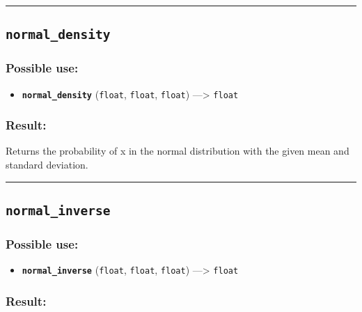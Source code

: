 \documentclass[]{book}
\providecommand{\tightlist}{%
  \setlength{\itemsep}{0pt}\setlength{\parskip}{0pt}}
\theoremstyle{definition}
\theoremstyle{definition}
\theoremstyle{definition}
\theoremstyle{remark}
\begin{document}
\begin{center}\rule{0.5\linewidth}{\linethickness}\end{center}

\subsection{\texorpdfstring{\texttt{normal\_density}}{normal\_density}}\label{normal_density}

\subsubsection{Possible use:}\label{possible-use-378}

\begin{itemize}
\tightlist
\item
  \textbf{\texttt{normal\_density}} (\texttt{float}, \texttt{float},
  \texttt{float}) ---\textgreater{} \texttt{float}
\end{itemize}

\subsubsection{Result:}\label{result-364}

Returns the probability of x in the normal distribution with the given
mean and standard deviation.

\begin{center}\rule{0.5\linewidth}{\linethickness}\end{center}

\subsection{\texorpdfstring{\texttt{normal\_inverse}}{normal\_inverse}}\label{normal_inverse}

\subsubsection{Possible use:}\label{possible-use-379}

\begin{itemize}
\tightlist
\item
  \textbf{\texttt{normal\_inverse}} (\texttt{float}, \texttt{float},
  \texttt{float}) ---\textgreater{} \texttt{float}
\end{itemize}

\subsubsection{Result:}\label{result-365}
\end{document}
